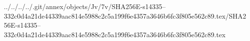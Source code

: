 ../../../../.git/annex/objects/Jv/7v/SHA256E-s14335--332c0d4a21de44339aac814e5988c2c5a199f6e4357a3646b6fc3f805e562c89.tex/SHA256E-s14335--332c0d4a21de44339aac814e5988c2c5a199f6e4357a3646b6fc3f805e562c89.tex